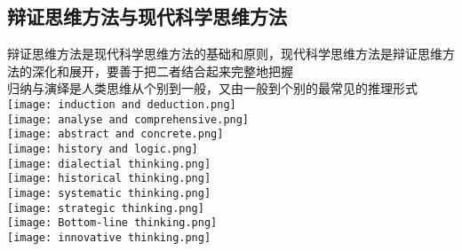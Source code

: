 \documentclass{article}
\begin{document}
		\subsection{辩证思维方法与现代科学思维方法}
			{\kaishu 辩证思维方法是现代科学思维方法的基础和原则，现代科学思维方法是辩证思维方法的深化和展开，要善于把二者结合起来完整地把握}\\
			{\kaishu 归纳与演绎是人类思维从个别到一般，又由一般到个别的最常见的推理形式}\\
			\texttt{[image: induction and deduction.png]}\\
			\texttt{[image: analyse and comprehensive.png]}\\
			\texttt{[image: abstract and concrete.png]}\\
			\texttt{[image: history and logic.png]}\\
			\texttt{[image: dialectial thinking.png]}\\
			\texttt{[image: historical thinking.png]}\\
			\texttt{[image: systematic thinking.png]}\\
			\texttt{[image: strategic thinking.png]}\\
			\texttt{[image: Bottom-line thinking.png]}\\
			\texttt{[image: innovative thinking.png]}
\end{document}
